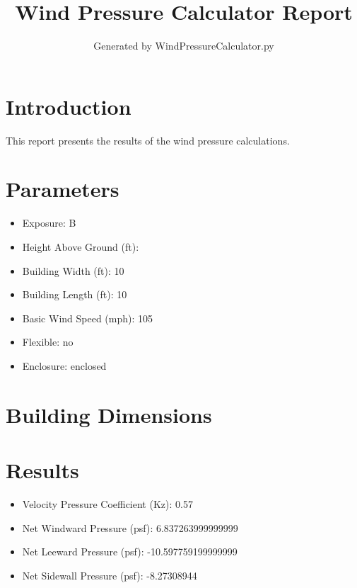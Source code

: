 \documentclass{article}
\title{Wind Pressure Calculator Report}
\author{Generated by WindPressureCalculator.py}
\begin{document}
\maketitle

\section{Introduction}
This report presents the results of the wind pressure calculations.

\section{Parameters}
\begin{itemize}
    \item Exposure: B
    \item Height Above Ground (ft): 
    \item Building Width (ft): 10
    \item Building Length (ft): 10
    \item Basic Wind Speed (mph): 105
    \item Flexible: no
    \item Enclosure: enclosed
\end{itemize}

\section{Building Dimensions}

\section{Results}
\begin{itemize}
    \item Velocity Pressure Coefficient (Kz): 0.57
    \item Net Windward Pressure (psf): 6.837263999999999
    \item Net Leeward Pressure (psf): -10.597759199999999
    \item Net Sidewall Pressure (psf): -8.27308944
\end{itemize}
\end{document}
